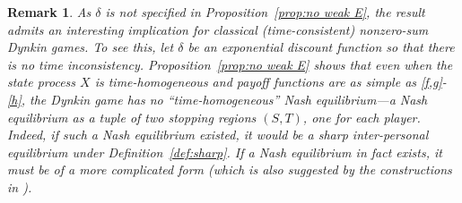 \documentclass[11pt,reqno]{article}
\numberwithin{equation}{section}
\newtheorem{remark}{Remark}[section]
\newcommand{\X}{\mathbb{X}}
\begin{document}
\begin{remark}
As $\delta$ is not specified in Proposition~\ref{prop:no weak E}, the result admits an interesting implication for classical (time-consistent) nonzero-sum Dynkin games. To see this, let $\delta$ be an exponential discount function so that there is no time inconsistency. Proposition~\ref{prop:no weak E} shows that even when the state process $X$ is time-homogeneous and payoff functions are as simple as \eqref{f,g}-\eqref{h}, the Dynkin game has no ``time-homogeneous'' Nash equilibrium---a Nash equilibrium as a tuple of two stopping regions $(S,T)$, one for each player. Indeed, if such a Nash equilibrium existed, it would be a sharp inter-personal equilibrium under Definition~\ref{def:sharp}. If a Nash equilibrium in fact exists, it must be of a more complicated form (which is also suggested by the constructions in \cite{HZ09, LS13}). 
\end{remark}

\end{document}
